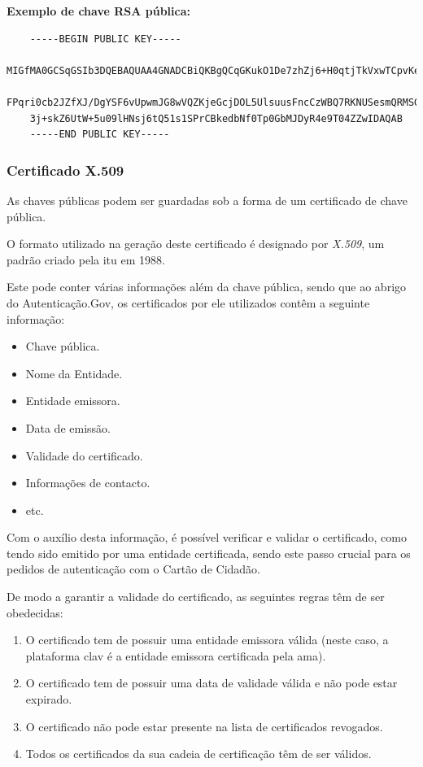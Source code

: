 \vspace{5mm}
\textbf{Exemplo de chave RSA pública:}

\begin{verbatim}
    -----BEGIN PUBLIC KEY-----
    MIGfMA0GCSqGSIb3DQEBAQUAA4GNADCBiQKBgQCqGKukO1De7zhZj6+H0qtjTkVxwTCpvKe4eCZ0
    FPqri0cb2JZfXJ/DgYSF6vUpwmJG8wVQZKjeGcjDOL5UlsuusFncCzWBQ7RKNUSesmQRMSGkVb1/
    3j+skZ6UtW+5u09lHNsj6tQ51s1SPrCBkedbNf0Tp0GbMJDyR4e9T04ZZwIDAQAB
    -----END PUBLIC KEY-----
\end{verbatim}

\cleardoublepage
\subsubsection{Certificado X.509}

As chaves públicas podem ser guardadas sob a forma de um certificado de chave pública. 

O formato utilizado na geração deste certificado é designado por \emph{X.509}\cite{x509}, um padrão criado pela \gls{itu} em 1988.

Este pode conter várias informações além da chave pública, sendo que ao abrigo do Autenticação.Gov, os certificados por ele utilizados contêm a seguinte informação:

\begin{itemize}
    \item Chave pública.
    \item Nome da Entidade.
    \item Entidade emissora.
    \item Data de emissão.
    \item Validade do certificado.
    \item Informações de contacto.
    \item etc.
\end{itemize}

Com o auxílio desta informação, é possível verificar e validar o certificado, como tendo sido emitido por uma entidade certificada, sendo este passo crucial para os pedidos de autenticação com o Cartão de Cidadão.

De modo a garantir a validade do certificado, as seguintes regras têm de ser obedecidas:

\begin{enumerate}
    \item O certificado tem de possuir uma entidade emissora válida (neste caso, a plataforma \gls{clav} é a entidade emissora certificada pela \gls{ama}).
    \item O certificado tem de possuir uma data de validade válida e não pode estar expirado.
    \item O certificado não pode estar presente na lista de certificados revogados.
    \item Todos os certificados da sua cadeia de certificação têm de ser válidos.
\end{enumerate}

